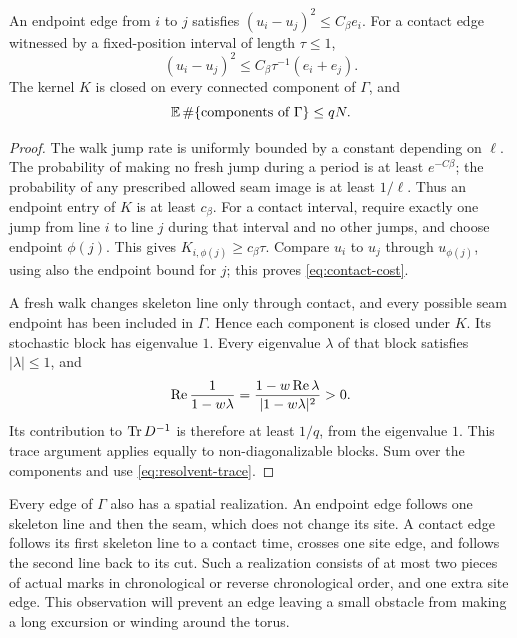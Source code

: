 \begin{lemma}
\label{lem:skeleton-graph}
An endpoint edge from $i$ to $j$ satisfies
$(u_i-u_j)^2\le C_\beta e_i$.
For a contact edge witnessed by a fixed-position interval of length
$\tau\le1$,
\begin{equation}\label{eq:contact-cost}
 (u_i-u_j)^2\le C_\beta\tau^{-1}(e_i+e_j).
\end{equation}
The kernel $K$ is closed on every connected component of $\Gamma$,
and
\begin{equation}\label{eq:component-count}
 \mathbb E\,\#\{\text{components of }\Gamma\}\le qN.
\end{equation}
\end{lemma}

\begin{proof}
The walk jump rate is uniformly bounded by a constant depending on
$\ell$.  The probability of making no fresh jump during a period
is at least $e^{-C\beta}$; the probability of any prescribed allowed
seam image is at least $1/\ell$.  Thus an endpoint entry of $K$ is
at least $c_\beta$.  For a contact interval, require exactly one
jump from line $i$ to line $j$ during that interval and no other
jumps, and choose endpoint $\phi(j)$.  This gives
$K_{i,\phi(j)}\ge c_\beta\tau$.  Compare $u_i$ to $u_j$
through $u_{\phi(j)}$, using also the endpoint bound for $j$;
this proves \eqref{eq:contact-cost}.

A fresh walk changes skeleton line only through contact, and every
possible seam endpoint has been included in $\Gamma$.  Hence each
component is closed under $K$.  Its stochastic block has eigenvalue
$1$.  Every eigenvalue $\lambda$ of that block satisfies
$|\lambda|\le1$, and
\[
 \operatorname{Re}\frac1{1-w\lambda}
 =\frac{1-w\operatorname{Re}\lambda}{|1-w\lambda|^2}>0.
\]
Its contribution to $\operatorname{Tr} D^{-1}$ is therefore at least $1/q$,
from the eigenvalue $1$.  This trace argument applies equally to
non-diagonalizable blocks.  Sum over the components and use
\eqref{eq:resolvent-trace}.
\end{proof}

Every edge of $\Gamma$ also has a spatial realization.  An endpoint
edge follows one skeleton line and then the seam, which does not
change its site.  A contact edge follows its first skeleton line to
a contact time, crosses one site edge, and follows the second line
back to its cut.  Such a realization consists of at most two pieces
of actual marks in chronological or reverse chronological order,
and one extra site edge.  This observation will prevent an edge
leaving a small obstacle from making a long excursion or winding
around the torus.

